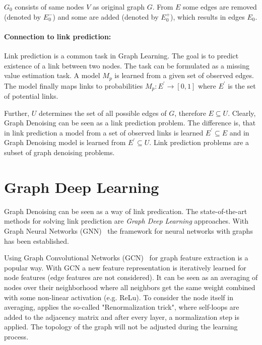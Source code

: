 $G_0$ consists of same nodes $V$ as original graph $G$. 
From $E$ some edges are removed (denoted by $E^{-}_0$) and some are added
(denoted by $E^{+}_0$), which results in edges $E_0$.

\paragraph{Connection to link prediction:}
Link prediction is a common task in Graph Learning. 
The goal is to predict existence of a link between two nodes.
The task can be formulated as a missing value estimation task. A model $M_p$ is learned
from a given set of observed edges. The model finally maps links to probabilities
$M_p : E^{\prime} \rightarrow [0,1]$ where $E^{\prime}$ is the set of potential links.

Further, $U$ determines the set of all possible edges of $G$, therefore $E \subseteq U$.
Clearly, Graph Denoising can be seen as a link prediction problem.
The difference is, that in link prediction a model from a set of observed links is learned
$E^{\prime} \subseteq E$ and in Graph Denoising model is learned from 
$E^{\prime} \subseteq U$. 
Link prediction problems are a subset of graph denoising problems.

\section{Graph Deep Learning}
\label{sec:graph_depp_learning}
Graph Denoising can be seen as a way of link predication. 
The state-of-the-art methods for solving link prediction are \textit{Graph Deep Learning} approaches.
With Graph Neural Networks (GNN)~\cite{GNN} the framework
for neural networks with graphs has been established. 

Using Graph Convolutional Networks (GCN)~\cite{GCN} for graph feature extraction is a popular way. 
With GCN a new feature representation is iteratively learned for node features (edge features are not considered).
It can be seen as an averaging of nodes over their neighborhood where all neighbors get the same weight combined with some non-linear activation (e.g. ReLu). 
To consider the node itself in averaging, \citet{GCN} applies the so-called "Renormalization trick", where self-loops are added to the 
adjacency matrix and after every layer, a normalization step is applied. 
The topology of the graph will not be adjusted during the learning process.


